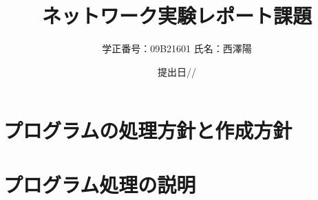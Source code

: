 \documentclass[11pt,a4j,titlepage]{jsarticle}
\begin{document}
\title{ネットワーク実験レポート課題}
\author{学正番号：09B21601 氏名：西澤陽}
\date{提出日//}
\maketitle
\section{プログラムの処理方針と作成方針}
\section{プログラム処理の説明}
\end{document}
